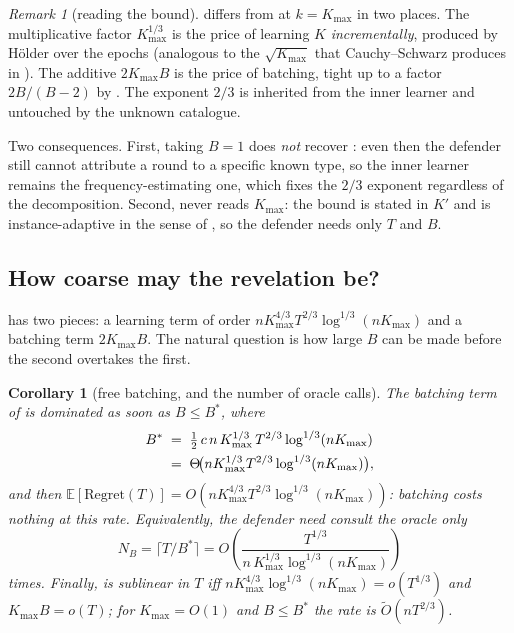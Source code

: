 \documentclass[letterpaper,9pt,twocolumn]{extarticle}
\newcommand{\EE}{\mathbb{E}}
\newcommand{\Kmax}{K_{\max}}
\newcommand{\Regret}{\mathrm{Regret}}
\theoremstyle{plain}
\newtheorem{corollary}[theorem]{Corollary}
\theoremstyle{definition}
\theoremstyle{remark}
\newtheorem{remark}[theorem]{Remark}
\begin{document}
\begin{remark}[reading the bound]
\label{rem:price}
 differs from \citet[Theorem 6.1]{balcan2015} at
$k=\Kmax$ in two places. The multiplicative factor $\Kmax^{1/3}$ is the
price of learning $K$ \emph{incrementally}, produced by H\"older over the
epochs (analogous to the $\sqrt{\Kmax}$ that Cauchy--Schwarz produces in
). The additive $2\Kmax B$ is the price of batching,
tight up to a factor $2B/(B-2)$ by . The exponent
$2/3$ is inherited from the inner learner and untouched by the unknown
catalogue.

Two consequences. First, taking $B=1$ does \emph{not} recover
: even then the defender still cannot attribute a round
to a specific known type, so the inner learner remains the
frequency-estimating one, which fixes the $2/3$ exponent regardless of
the decomposition. Second,  never reads $\Kmax$: the
bound is stated in $K'$ and is instance-adaptive in the sense of
, so the defender needs only $T$ and $B$.
\end{remark}

\subsection{How coarse may the revelation be?}

 has two pieces: a learning term of order
$n\Kmax^{4/3}T^{2/3}\log^{1/3}(n\Kmax)$ and a batching term $2\Kmax B$.
The natural question is how large $B$ can be made before the second
overtakes the first.

\begin{corollary}[free batching, and the number of oracle calls]
\label{cor:B}
The batching term of  is dominated as soon as $B\le B^{*}$, where
\begin{align}
B^{*}\;&=\;\tfrac{1}{2}\,c\,n\,\Kmax^{1/3}\,T^{2/3}\log^{1/3}(n\Kmax)\notag\\
&=\;\Theta\!\bigl(n\Kmax^{1/3}T^{2/3}\log^{1/3}(n\Kmax)\bigr),
\label{eq:Bstar}
\end{align}
and then $\EE[\Regret(T)]=O(n\Kmax^{4/3}T^{2/3}\log^{1/3}(n\Kmax))$:
batching costs nothing at this rate. Equivalently, the defender need
consult the oracle only
\begin{equation}
N_B=\lceil T/B^{*}\rceil=
O\!\left(\frac{T^{1/3}}{n\,\Kmax^{1/3}\log^{1/3}(n\Kmax)}\right)
\label{eq:ncalls}
\end{equation}
times. Finally,  is sublinear in $T$ iff
$n\Kmax^{4/3}\log^{1/3}(n\Kmax)=o(T^{1/3})$ and $\Kmax B=o(T)$; for
$\Kmax=O(1)$ and $B\le B^{*}$ the rate is $\tilde O(nT^{2/3})$.
\end{corollary}
\end{document}
